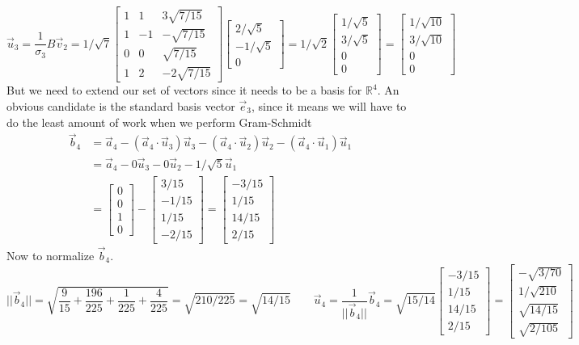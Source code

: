 \documentclass{report}
\begin{document}
$$
\vec{u}_3 = \frac{1}{\sigma_3}B\vec{v}_2 = 1/\sqrt{7}
\begin{bmatrix}
1&1&3\sqrt{7/15}\\
1&-1&-\sqrt{7/15}\\
0&0&\sqrt{7/15}\\
1&2&-2\sqrt{7/15}
\end{bmatrix}
\begin{bmatrix}2/\sqrt{5}\\-1/\sqrt{5}\\0\end{bmatrix} =
1/\sqrt{2}\begin{bmatrix}1/\sqrt{5}\\3/\sqrt{5}\\0\\0\end{bmatrix} = \begin{bmatrix}1/\sqrt{10}\\3/\sqrt{10}\\0\\0\end{bmatrix}
$$
But we need to extend our set of vectors since it needs to be a basis for $\mathbb{R}^4$. An obvious candidate is the standard basis vector $\vec{e}_3$, since it means we will have to do the least amount of work when we perform Gram-Schmidt
$$
\begin{aligned}
\vec{b}_4 &= \vec{a}_4 - (\vec{a}_4\cdot\vec{u}_3)\vec{u}_3 - (\vec{a}_4\cdot\vec{u}_2)\vec{u}_2 - (\vec{a}_4\cdot\vec{u}_1)\vec{u}_1\\
&= \vec{a}_4 - 0\vec{u}_3 - 0\vec{u}_2 - 1/\sqrt{5}\vec{u}_1\\
&=\begin{bmatrix}0\\0\\1\\0\end{bmatrix} - \begin{bmatrix}3/15\\-1/15\\1/15\\-2/15\end{bmatrix} = \begin{bmatrix}-3/15\\1/15\\14/15\\2/15\end{bmatrix}
\end{aligned}
$$
Now to normalize $\vec{b}_4$.
$$
||\vec{b}_4|| = \sqrt{\frac{9}{15} + \frac{196}{225} + \frac{1}{225} + \frac{4}{225}} = \sqrt{210/225} = \sqrt{14/15} \qquad \vec{u}_4 = \frac{1}{||\vec{b}_4||}\vec{b}_4 = \sqrt{15/14}\begin{bmatrix}-3/15\\1/15\\14/15\\2/15\end{bmatrix} =\begin{bmatrix}-\sqrt{3/70}\\1/\sqrt{210}\\\sqrt{14/15}\\\sqrt{2/105}\end{bmatrix}
$$
\end{document}
